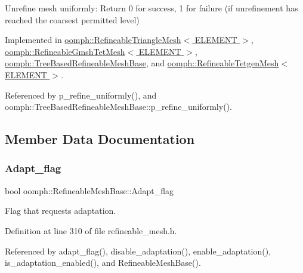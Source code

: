 Unrefine mesh uniformly\+: Return 0 for success, 1 for failure (if unrefinement has reached the coarsest permitted level) 



Implemented in \hyperlink{classoomph_1_1RefineableTriangleMesh_ae52c6aea299625c683522f00a89ff33d}{oomph\+::\+Refineable\+Triangle\+Mesh$<$ E\+L\+E\+M\+E\+N\+T $>$}, \hyperlink{classoomph_1_1RefineableGmshTetMesh_aa243fd14b5f168f541e5451766a9f68d}{oomph\+::\+Refineable\+Gmsh\+Tet\+Mesh$<$ E\+L\+E\+M\+E\+N\+T $>$}, \hyperlink{classoomph_1_1TreeBasedRefineableMeshBase_a52940028ba9f6472df7e7c65be265057}{oomph\+::\+Tree\+Based\+Refineable\+Mesh\+Base}, and \hyperlink{classoomph_1_1RefineableTetgenMesh_add609c3184ffa1786e183f4c6dc24a57}{oomph\+::\+Refineable\+Tetgen\+Mesh$<$ E\+L\+E\+M\+E\+N\+T $>$}.



Referenced by p\+\_\+refine\+\_\+uniformly(), and oomph\+::\+Tree\+Based\+Refineable\+Mesh\+Base\+::p\+\_\+refine\+\_\+uniformly().



\subsection{Member Data Documentation}
\mbox{\label{classoomph_1_1RefineableMeshBase_a2bc0a1c6c011672442049d9032774ca4}} 
\subsubsection{\texorpdfstring{Adapt\+\_\+flag}{Adapt\_flag}}
{\footnotesize\ttfamily bool oomph\+::\+Refineable\+Mesh\+Base\+::\+Adapt\+\_\+flag\hspace{0.3cm}{\ttfamily [protected]}}



Flag that requests adaptation. 



Definition at line 310 of file refineable\+\_\+mesh.\+h.



Referenced by adapt\+\_\+flag(), disable\+\_\+adaptation(), enable\+\_\+adaptation(), is\+\_\+adaptation\+\_\+enabled(), and Refineable\+Mesh\+Base().

